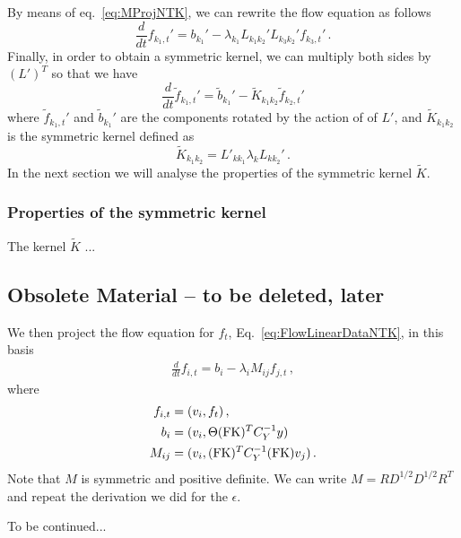 \documentclass[11pt]{article}
\begin{document}
By means of eq.~\eqref{eq:MProjNTK}, we can rewrite the flow equation as follows
\begin{equation}
  \frac{d}{dt}f_{k_1,t}' = b_{k_1}' - \lambda_{k_1} L_{k_1 k_2}' L_{k_3 k_2}' f_{k_3,t}' \,.
\end{equation}
Finally, in order to obtain a symmetric kernel, we can multiply both sides by $(L')^T$ so that we have
\begin{equation}
  \frac{d}{dt} \tilde{f}_{k_1,t}' = \tilde{b}_{k_1}' - \tilde{K}_{k_1 k_2} \tilde{f}_{k_2,t}'
\end{equation}
where $\tilde{f}_{k_1,t}'$ and $\tilde{b}_{k_1}'$ are the components rotated by the action of of
$L'$, and $\tilde{K}_{k_1 k_2}$ is the symmetric kernel defined as
\begin{equation}
  \tilde{K}_{k_1 k_2} = L'_{kk_1} \lambda_{k} L_{kk_2}' \,.
\end{equation}
In the next section we will analyse the properties of the symmetric kernel $\tilde{K}$.

\subsubsection*{Properties of the symmetric kernel}
The kernel $\tilde{K}$ ...



\newpage
\subsection*{Obsolete Material -- to be deleted, later}

We then project the flow equation for $f_t$, Eq.~\ref{eq:FlowLinearDataNTK}, in this basis
\begin{align}
    \label{eq:FlowEigenbasisNTK}
    \frac{d}{dt} f_{i,t} = b_i - \lambda_i M_{ij} f_{j,t}\, ,
\end{align} 
where
\begin{align}
    f_{i,t} &= (v_i, f_t)\, , \\
    b_i &= (v_i, \Theta (\mathrm{FK})^T C_Y^{-1} y)\, \\
    M_{ij} &= (v_i, (\mathrm{FK})^T C_Y^{-1} (\mathrm{FK}) v_j)\, .
\end{align}
Note that $M$ is symmetric and positive definite. We can write $M = R D^{1/2} D^{1/2} R^T$ and repeat the 
derivation we did for the $\epsilon$.

To be continued... 
\end{document}
